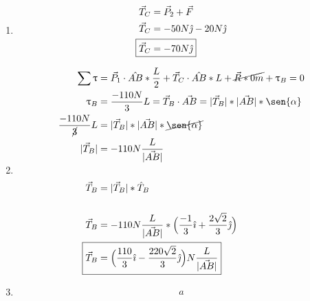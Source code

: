 \documentclass[12pt, twoside]{article}
\begin{document}
\begin{enumerate}
		\begin{enumerate}
			\item
				\begin{align*}
					\vec{T}_C &= \vec{P}_2 + \vec{F}\\
					\vec{T}_C &= -50N\hat{\jmath}-20N\hat{\jmath}\\
					\Aboxed
					{
						\vec{T}_C &= -70N\hat{\jmath}
					}
				\end{align*}
			\item
				\begin{align*}
					\sum \uptau &= \vec{P}_1\cdot\hat{AB}* \frac{L}{2}+
					\vec{T}_C\cdot\hat{AB}*L+
					\cancel{\vec{R}*0m}+
					\uptau_B=0\\
					\uptau_B &= \frac{-110N}{3}L = \vec{T}_B \cdot\vec{AB} = |\vec{T}_B|*|\vec{AB}|*\sen{\alpha}\\
					\frac{-110N}{\cancel{3}}L &= |\vec{T}_B|*|\vec{AB}|*\cancel{\sen{\alpha}}\\
					|\vec{T}_B| &= -110N\frac{L}{|\vec{AB}|}\\
					\\
					\vec{T}_B &= |\vec{T}_B|*\hat{T}_B\\
					\\
					\vec{T}_B &= -110N\frac{L}{|\vec{AB}|}*\Big{(}
					\frac{-1}{3}\hat{\imath} +
					\frac{2\sqrt{2}}{3}\hat{\jmath}
					\Big{)}\\
					\Aboxed
					{
						\vec{T}_B &= \Big{(}
						\frac{110}{3}\hat{\imath} -
						\frac{220\sqrt{2}}{3}\hat{\jmath}
						\Big{)}N\frac{L}{|\vec{AB}|}
					}
				\end{align*}
			\item
				\begin{align*}
					a
				\end{align*}
		\end{enumerate}
\end{enumerate}
\end{document}
